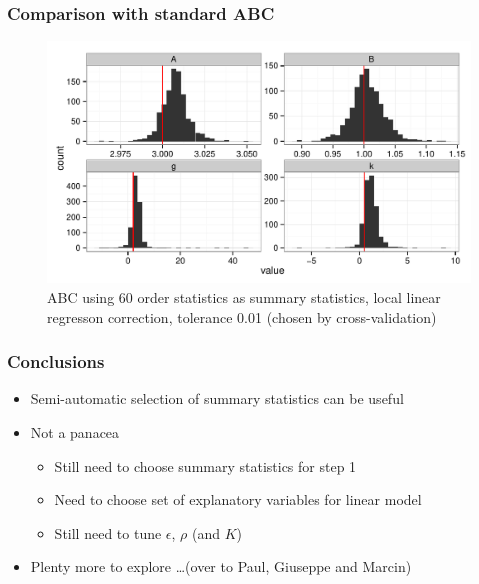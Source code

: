 \documentclass{beamer}
\begin{document}
\begin{frame}
\frametitle{Comparison with standard ABC}
\begin{figure}
\includegraphics[width = \linewidth]{GK_REG_M_HIST.pdf}
\caption{ABC using 60 order statistics as summary statistics, local linear regresson correction, tolerance 0.01 (chosen by cross-validation)}
\end{figure}
\end{frame}

\begin{frame}
\frametitle{Conclusions}
\begin{itemize}
\item Semi-automatic selection of summary statistics can be useful
\item Not a panacea
\begin{itemize}
\item Still need to choose summary statistics for step 1 
\item Need to choose set of explanatory variables for linear model
\item Still need to tune $\epsilon$, $\rho$ (and $K$)
\end{itemize} 
\item Plenty more to explore \ldots (over to Paul, Giuseppe and Marcin)
\end{itemize}
\end{frame}
\end{document}
